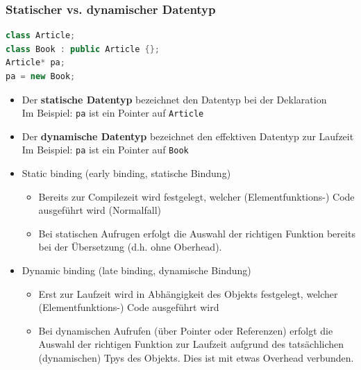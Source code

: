 \subsubsection{Statischer vs. dynamischer Datentyp}
\begin{lstlisting}[language=C++]
class Article;
class Book : public Article {};
Article* pa;
pa = new Book;
\end{lstlisting}
\begin{itemize}
  \item Der \textbf{statische Datentyp} bezeichnet den Datentyp bei der Deklaration\\
  Im Beispiel: \lstinline{pa} ist ein Pointer auf \lstinline{Article}
  \item Der \textbf{dynamische Datentyp} bezeichnet den effektiven Datentyp zur Laufzeit\\
  Im Beispiel: \lstinline{pa} ist ein Pointer auf \lstinline{Book}
\end{itemize}
\begin{itemize}
	\item Static binding (early binding, statische Bindung)
		\begin{itemize}
			\item Bereits zur Compilezeit wird festgelegt, welcher (Elementfunktions-) Code
				ausgeführt wird (Normalfall)
			\item Bei statischen Aufrugen erfolgt die Auswahl der richtigen Funktion bereits bei der Übersetzung (d.h. ohne Oberhead).
		\end{itemize}
	\item Dynamic binding (late binding, dynamische Bindung)
		\begin{itemize}
			\item Erst zur Laufzeit wird in Abhängigkeit des Objekts festgelegt, welcher
				(Elementfunktions-) Code ausgeführt wird
      \item Bei dynamischen Aufrufen (über Pointer oder Referenzen) erfolgt die Auswahl der richtigen Funktion zur Laufzeit aufgrund des tatsächlichen (dynamischen) Tpys des Objekts. Dies ist mit etwas Overhead verbunden.
		\end{itemize}
\end{itemize}

